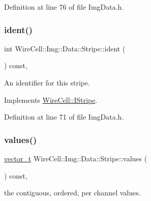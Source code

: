 Definition at line 76 of file Img\+Data.\+h.

\mbox{\label{class_wire_cell_1_1_img_1_1_data_1_1_stripe_a9795b25ab93a45b59670f8105dbb78ae}} 
\subsubsection{\texorpdfstring{ident()}{ident()}}
{\footnotesize\ttfamily int Wire\+Cell\+::\+Img\+::\+Data\+::\+Stripe\+::ident (\begin{DoxyParamCaption}{ }\end{DoxyParamCaption}) const\hspace{0.3cm}{\ttfamily [inline]}, {\ttfamily [virtual]}}



An identifier for this stripe. 



Implements \hyperlink{class_wire_cell_1_1_i_stripe_a9873be5b4e6796ac5f08ea1511b0ae1f}{Wire\+Cell\+::\+I\+Stripe}.



Definition at line 71 of file Img\+Data.\+h.

\mbox{\label{class_wire_cell_1_1_img_1_1_data_1_1_stripe_a72dce0e16019dff990761fc29fca0e30}} 
\subsubsection{\texorpdfstring{values()}{values()}}
{\footnotesize\ttfamily \hyperlink{class_wire_cell_1_1_i_stripe_af5a7b9f663e9ecbc71edfb44c989101e}{vector\+\_\+t} Wire\+Cell\+::\+Img\+::\+Data\+::\+Stripe\+::values (\begin{DoxyParamCaption}{ }\end{DoxyParamCaption}) const\hspace{0.3cm}{\ttfamily [inline]}, {\ttfamily [virtual]}}



the contiguous, ordered, per channel values. 



